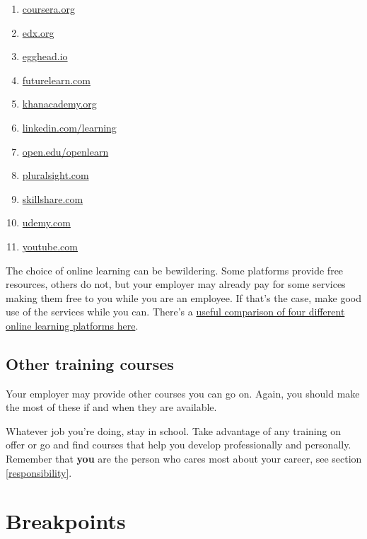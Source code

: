 \documentclass[
]{book}
\providecommand{\tightlist}{%
  \setlength{\itemsep}{0pt}\setlength{\parskip}{0pt}}
\begin{document}
\begin{enumerate}
\def\labelenumi{\arabic{enumi}.}
\tightlist
\item
  \href{https://www.coursera.org}{coursera.org}
\item
  \href{https://www.edx.org}{edx.org}
\item
  \href{https://egghead.io/}{egghead.io}
\item
  \href{https://www.futurelearn.com/}{futurelearn.com}
\item
  \href{https://www.khanacademy.org/}{khanacademy.org}
\item
  \href{https://www.linkedin.com/learning}{linkedin.com/learning}
\item
  \href{https://www.open.edu/openlearn/}{open.edu/openlearn}
\item
  \href{https://www.pluralsight.com}{pluralsight.com}
\item
  \href{https://www.skillshare.com/}{skillshare.com}
\item
  \href{https://www.udemy.com}{udemy.com}
\item
  \href{https://www.youtube.com/}{youtube.com}
\end{enumerate}

The choice of online learning can be bewildering. Some platforms provide free resources, others do not, but your employer may already pay for some services making them free to you while you are an employee. If that's the case, make good use of the services while you can. There's a \href{https://www.businessinsider.com/online-learning-platform-comparison-udemy-skillshare-lynda-coursera}{useful comparison of four different online learning platforms here}. \citep{udemy}

\hypertarget{othertrain}{%
\subsection{Other training courses}\label{othertrain}}

Your employer may provide other courses you can go on. Again, you should make the most of these if and when they are available.

Whatever job you're doing, stay in school. Take advantage of any training on offer or go and find courses that help you develop professionally and personally. Remember that \textbf{you} are the person who cares most about your career, see section \ref{responsibility}.

\hypertarget{visits}{%
\section{Breakpoints}\label{visits}}
\end{document}
